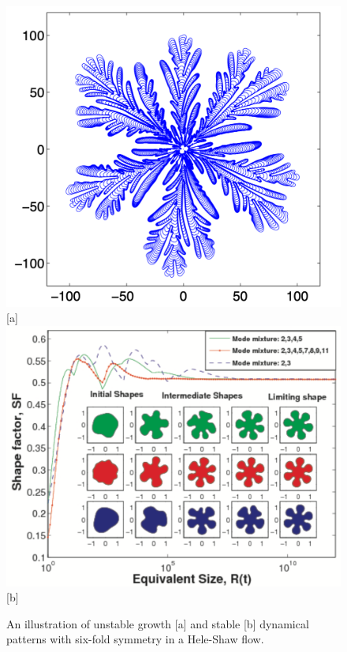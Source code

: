 \begin{figure}[ht!]
  \centering
  \includegraphics[scale=0.3]{Unstable}[a]
  \includegraphics[scale=0.28]{Stable2}[b]
  \caption{An illustration of unstable growth [a] and stable [b] dynamical patterns with six-fold symmetry in a Hele-Shaw flow.}
  \label{figA}
  \end{figure}

